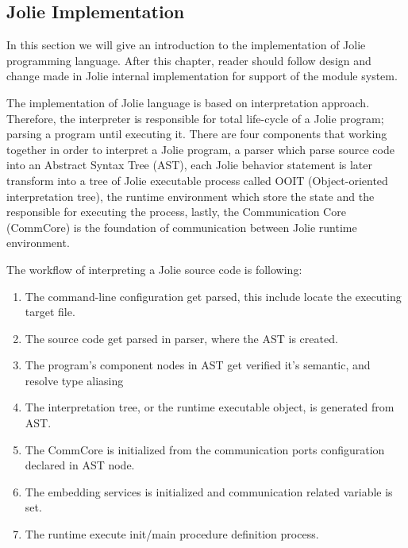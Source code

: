 \subsection{Jolie Implementation}
\label{sec:jolie-implementation}
In this section we will give an introduction to the implementation of Jolie programming language. After this chapter, reader should follow design and change made in Jolie internal implementation for support of the module system.

The implementation of Jolie language is based on interpretation approach. Therefore, the interpreter is responsible for total life-cycle of a Jolie program; parsing a program until executing it. There are four components that working together in order to interpret a Jolie program, a parser which parse source code into an Abstract Syntax Tree (AST), each Jolie behavior statement is later transform into a tree of Jolie executable process called OOIT (Object-oriented interpretation tree), the runtime environment which store the state and the responsible for executing the process, lastly, the Communication Core (CommCore) is the foundation of communication between Jolie runtime environment.

The workflow of interpreting a Jolie source code is following:

\begin{enumerate}
    \item The command-line configuration get parsed, this include locate the executing target file.
    \item The source code get parsed in parser, where the AST is created.
    \item The program's component nodes in AST get verified it's semantic, and resolve type aliasing
    \item The interpretation tree, or the runtime executable object, is generated from AST.
    \item The CommCore is initialized from the communication ports configuration declared in AST node.
    \item The embedding services is initialized and communication related variable is set.
    \item The runtime execute init/main procedure definition process.
\end{enumerate}


\FloatBarrier


